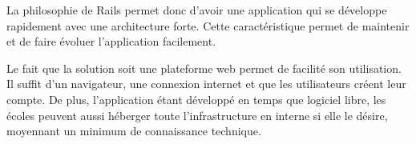 La philosophie de Rails permet donc d'avoir une application qui se développe rapidement avec une architecture forte. Cette caractéristique permet de maintenir et de faire évoluer l'application facilement.

Le fait que la solution soit une plateforme web permet de facilité son utilisation. Il suffit d'un navigateur, une connexion internet et que les utilisateurs créent leur compte. De plus, l'application étant développé en temps que logiciel libre, les écoles peuvent aussi héberger toute l'infrastructure en interne si elle le désire, moyennant un minimum de connaissance technique.